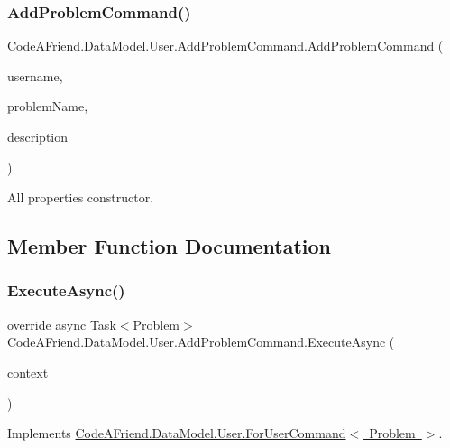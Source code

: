 \subsubsection{\texorpdfstring{Add\+Problem\+Command()}{AddProblemCommand()}}
{\footnotesize\ttfamily Code\+A\+Friend.\+Data\+Model.\+User.\+Add\+Problem\+Command.\+Add\+Problem\+Command (\begin{DoxyParamCaption}\item[{string}]{username,  }\item[{string}]{problem\+Name,  }\item[{string}]{description }\end{DoxyParamCaption})}



All properties constructor.



\subsection{Member Function Documentation}
\mbox{\label{class_code_a_friend_1_1_data_model_1_1_user_1_1_add_problem_command_a43eff118c9d451d384008fe68559d50d}} 
\subsubsection{\texorpdfstring{Execute\+Async()}{ExecuteAsync()}}
{\footnotesize\ttfamily override async Task$<$\mbox{\hyperlink{class_code_a_friend_1_1_data_model_1_1_problem}{Problem}}$>$ Code\+A\+Friend.\+Data\+Model.\+User.\+Add\+Problem\+Command.\+Execute\+Async (\begin{DoxyParamCaption}\item[{Db\+Context}]{context }\end{DoxyParamCaption})\hspace{0.3cm}{\ttfamily [virtual]}}







Implements \mbox{\hyperlink{class_code_a_friend_1_1_data_model_1_1_user_1_1_for_user_command_aa9abf9da11dd2a573d8ed93bcf53f6df}{Code\+A\+Friend.\+Data\+Model.\+User.\+For\+User\+Command$<$ Problem $>$}}.



